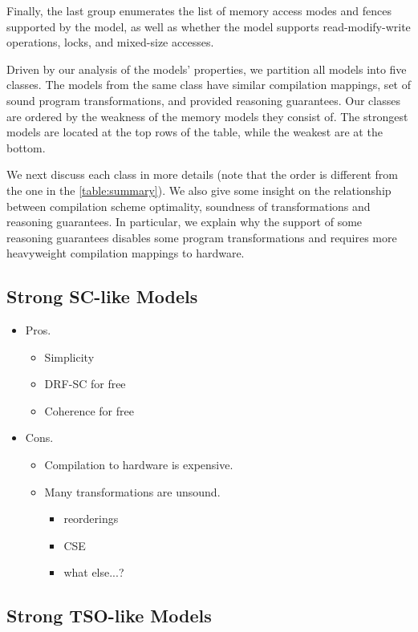 Finally, the last group enumerates the list of memory access modes 
and fences supported by the model, as well as whether the model 
supports read-modify-write operations, locks, and mixed-size accesses.

Driven by our analysis of the models' properties, we partition all models into five classes. 
The models from the same class have similar compilation mappings, 
set of sound program transformations, and provided reasoning guarantees.
Our classes are ordered by the weakness of the memory models they consist of.  
The strongest models are located at the top rows of the table, 
while the weakest are at the bottom. 

We next discuss each class in more details
(note that the order is different from the one in the \cref{table:summary}). 
We also give some insight on the relationship
between compilation scheme optimality, 
soundness of transformations and reasoning guarantees.
In particular, we explain why the support of some reasoning guarantees 
disables some program transformations and requires more heavyweight 
compilation mappings to hardware.

\subsection{Strong SC-like Models}

\begin{itemize}
  \item Pros.
  \begin{itemize}
    \item Simplicity
    \item DRF-SC for free
    \item Coherence for free
  \end{itemize}
  \item Cons.
  \begin{itemize}
    \item Compilation to hardware is expensive.
    \item Many transformations are unsound.
    \begin{itemize}
      \item reorderings
      \item CSE
      \item what else...?
    \end{itemize}
  \end{itemize}
\end{itemize}

\subsection{Strong TSO-like Models}

